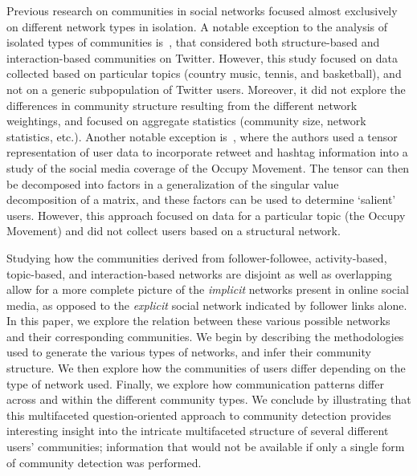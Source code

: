 Previous research on communities in social networks focused almost exclusively on different network types in isolation.
A notable exception to the analysis of isolated types of communities is~\cite{lim2012tweets}, that considered both structure-based and interaction-based communities on Twitter. However, this study focused on data collected based on particular topics (country music, tennis, and basketball), and not on a generic subpopulation of Twitter users. Moreover, it did not explore the differences in community structure resulting from the different network weightings, and focused on aggregate statistics (community size, network statistics, etc.). Another notable exception is~\cite{kao2013talison}, where the authors used a tensor representation of user data to incorporate retweet and hashtag information into a study of the social media coverage of the Occupy Movement. The tensor can then be decomposed into factors in a generalization of the singular value decomposition of a matrix, and these factors can be used to determine `salient' users. However, this approach focused on data for a particular topic (the Occupy Movement) and did not collect users based on a structural network.

Studying how the communities derived from follower-followee, activity-based, topic-based, and interaction-based networks are disjoint as well as overlapping allow for a more complete picture of the \emph{implicit} networks present in online social media, as opposed to the \emph{explicit} social network indicated by follower links alone. In this paper, we explore the relation between these various possible networks and their corresponding communities. We begin by describing the methodologies used to generate the various types of networks, and infer their community structure.  We then explore how the communities of users differ depending on the type of network used. Finally, we explore how communication patterns differ across and within the different community types. We conclude by illustrating that this multifaceted question-oriented approach to community detection provides interesting insight into the intricate multifaceted structure of several different users' communities; information that would not be available if only a single form of community detection was performed. 


